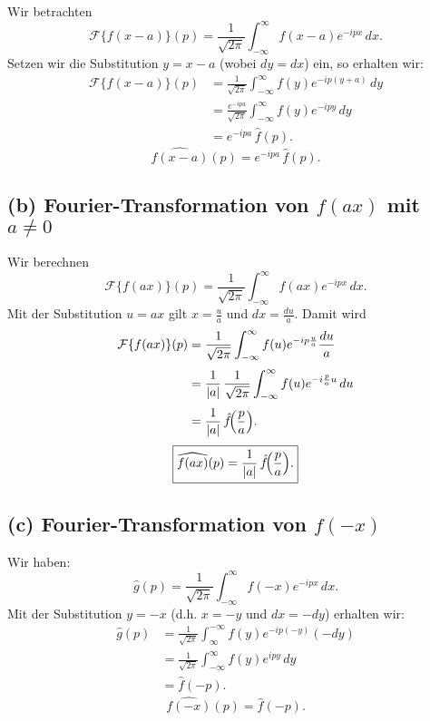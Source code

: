 \documentclass[a4paper,12pt]{article}
\begin{document}
Wir betrachten
\[
\mathcal{F}\{f(x-a)\}(p) = \frac{1}{\sqrt{2\pi}} \int_{-\infty}^{\infty} f(x-a)e^{-ipx}\,dx.
\]
Setzen wir die Substitution \( y=x-a \) (wobei \( dy=dx \)) ein, so erhalten wir:
\[
\begin{aligned}
\mathcal{F}\{f(x-a)\}(p)
&=\frac{1}{\sqrt{2\pi}} \int_{-\infty}^{\infty} f(y)e^{-ip(y+a)}\,dy\\[1mm]
&=\frac{e^{-ipa}}{\sqrt{2\pi}} \int_{-\infty}^{\infty} f(y)e^{-ipy}\,dy\\[1mm]
&= e^{-ipa}\,\hat{f}(p).
\end{aligned}
\]
\[
\boxed{\widehat{f(x-a)}(p)=e^{-ipa}\,\hat{f}(p).}
\]

\subsection*{(b) Fourier-Transformation von \( f(ax) \) mit \( a\neq 0 \)}

Wir berechnen
\[
\mathcal{F}\{f(ax)\}(p) = \frac{1}{\sqrt{2\pi}} \int_{-\infty}^{\infty} f(ax)e^{-ipx}\,dx.
\]
Mit der Substitution \( u=ax \) gilt \( x=\frac{u}{a} \) und \( dx=\frac{du}{a} \). Damit wird
\[
\begin{aligned}
\mathcal{F}\{f(ax)\}(p)
&=\frac{1}{\sqrt{2\pi}} \int_{-\infty}^{\infty} f(u)e^{-ip\frac{u}{a}}\frac{du}{a}\\[1mm]
&=\frac{1}{|a|}\,\frac{1}{\sqrt{2\pi}} \int_{-\infty}^{\infty} f(u)e^{-i\frac{p}{a}u}\,du\\[1mm]
&=\frac{1}{|a|}\,\hat{f}\!\Bigl(\frac{p}{a}\Bigr).
\end{aligned}
\]
\[
\boxed{\widehat{f(ax)}(p)=\frac{1}{|a|}\,\hat{f}\!\Bigl(\frac{p}{a}\Bigr).}
\]

\subsection*{(c) Fourier-Transformation von \( f(-x) \)}

Wir haben:
\[
\hat{g}(p)=\frac{1}{\sqrt{2\pi}}\int_{-\infty}^{\infty} f(-x)e^{-ipx}\,dx.
\]
Mit der Substitution \( y=-x \) (d.h. \( x=-y \) und \( dx=-dy \)) erhalten wir:
\[
\begin{aligned}
\hat{g}(p)
&=\frac{1}{\sqrt{2\pi}}\int_{\infty}^{-\infty} f(y)e^{-ip(-y)}(-dy)\\[1mm]
&=\frac{1}{\sqrt{2\pi}}\int_{-\infty}^{\infty} f(y)e^{ipy}\,dy\\[1mm]
&=\hat{f}(-p).
\end{aligned}
\]
\[
\boxed{\widehat{f(-x)}(p)=\hat{f}(-p).}
\]
\end{document}
